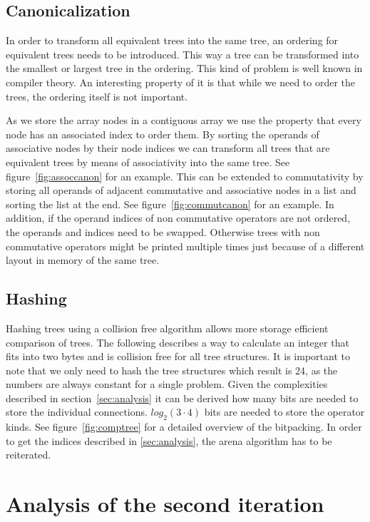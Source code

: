 \documentclass[11pt,a4paper]{article}
\begin{document}
\subsection{Canonicalization}

In order to transform all equivalent trees into the same tree, an
ordering for equivalent trees needs to be introduced.
This way a tree can be transformed into the smallest or largest tree
in the ordering.
This kind of problem is well known in compiler theory.
An interesting property of it is that while we need to order the
trees, the ordering itself is not important.

As we store the array nodes in a contiguous array we use the property
that every node has an associated index to order them.
By sorting the operands of associative nodes by their node indices we
can transform all trees that are equivalent trees by means of
associativity into the same tree. See figure~\ref{fig:assoccanon} for
an example.
This can be extended to commutativity by storing all operands of
adjacent commutative and associative nodes in a list and sorting the
list at the end.
See figure~\ref{fig:commutcanon} for an example.
In addition, if the operand indices of non commutative operators are
not ordered, the operands and indices need to be swapped.
Otherwise trees with non commutative operators might be printed
multiple times just because of a different layout in memory of the
same tree.

\subsection{Hashing}

Hashing trees using a collision free algorithm allows more storage
efficient comparison of trees.
The following describes a way to calculate an integer that fits into
two bytes and is collision free for all tree structures.
It is important to note that we only need to hash the tree structures
which result is 24, as the numbers are always constant for a single
problem.
Given the complexities described in section~\ref{sec:analysis} it can
be derived how many bits are needed to store the individual
connections.
$log_2{(3 \cdot 4)}$ bits are needed to store the operator kinds.
See figure~\ref{fig:comptree} for a detailed overview of the
bitpacking.
In order to get the indices described in \ref{sec:analysis}, the arena
algorithm has to be reiterated.

\section{Analysis of the second iteration}
\end{document}
